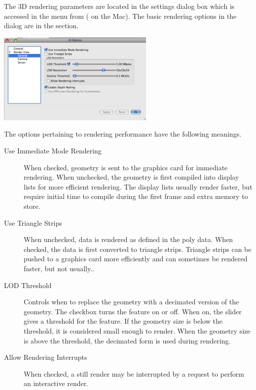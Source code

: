 The 3D rendering parameters are located in the settings dialog box which is
accessed in the menu from  \ra {} ( \ra
{} on the Mac).  The basic rendering options in the dialog
are in the  \ra {} section.

\begin{inlinefig}
  \includegraphics[width=3in]{images/SettingsRendering}
\end{inlinefig}

The options pertaining to rendering performance have the following
meanings.

\begin{description}
\item[Use Immediate Mode Rendering]  When
  checked, geometry is sent to the graphics card for immediate rendering.
  When unchecked, the geometry is first compiled into display lists for
  more efficient rendering.  The display lists usually render faster, but
  require initial time to compile during the first frame and extra memory
  to store.
\item[Use Triangle Strips]  When unchecked, data is
  rendered as defined in the poly data.  When checked, the data is first
  converted to triangle strips.  Triangle strips can be pushed to a
  graphics card more efficiently and can sometimes be rendered faster, but
  not usually..
\item[LOD Threshold] Controls when to replace the
  geometry with a decimated version of the geometry.  The checkbox turns
  the feature on or off.  When on, the slider gives a threshold for the
  feature.  If the geometry size is below the threshold, it is considered
  small enough to render.  When the geometry size is above the threshold,
  the decimated form is used during rendering.
\item[Allow Rendering Interrupts]  When
  checked, a still render may be interrupted by a request to perform an
  interactive render.
\end{description}

